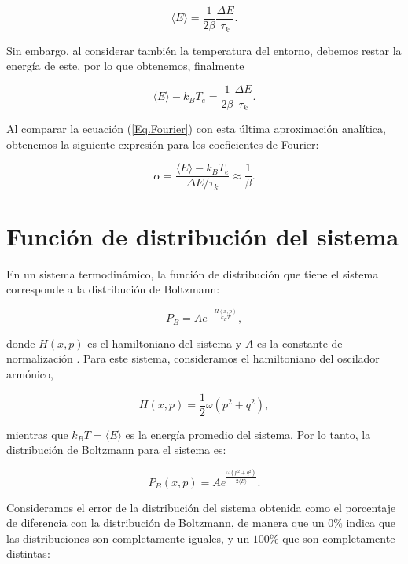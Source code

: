 \documentclass[letterpaper,12pt,oneside]{book}
\begin{document}
	\begin{equation}
	\langle E  \rangle = \frac{1}{2\beta} \frac{\Delta E}{\tau_k}.
	\end{equation}
	
	Sin embargo, al considerar también la temperatura del entorno, debemos restar la energía de este, por lo que obtenemos, finalmente
	
	\begin{equation}
	\langle E  \rangle - k_BT_e = \frac{1}{2\beta} \frac{\Delta E}{\tau_k}.
	\end{equation}
	
	Al comparar la ecuación (\ref{Eq.Fourier}) con esta última aproximación analítica, obtenemos la siguiente expresión para los coeficientes de Fourier:
	
	\begin{equation}\label{eq:FourierNumericalCoeffs}
	\alpha = \frac{\langle E \rangle - k_B T_e}{\Delta E/\tau_k} \approx \frac{1}{\beta}.
	\end{equation}
	
	\section{Funci\'on de distribuci\'on del sistema}
	
	En un sistema termodinámico, la función de distribución que tiene el sistema corresponde a la distribución de Boltzmann:
	
	
	\begin{equation}\label{Eq:BoltzmannDist}
	P_B = Ae^{-\frac{H(x,p)}{k_BT}},
	\end{equation}
	
	\noindent donde $H(x,p)$ es el hamiltoniano del sistema y $A$ es la constante de normalización \cite{CursoFisEstadistica}. Para este sistema, consideramos el hamiltoniano del oscilador arm\'onico, 
	
	\begin{equation}
	H(x,p) = \frac{1}{2}\omega(p^2 + q^2),
	\end{equation}
	
	\noindent mientras que $k_BT = \langle E \rangle$ es la energía promedio del sistema. Por lo tanto, la distribución de Boltzmann para el sistema es:
	
	\begin{equation}
	P_B(x,p) = Ae^{\frac{\omega(p^2+q^2)}{2\langle E \rangle }}.
	\end{equation}
	
	Consideramos el error de la distribución del sistema obtenida como el porcentaje de diferencia con la distribución de Boltzmann, de manera que un $0\%$ indica que las distribuciones son completamente iguales, y un $100\%$ que son completamente distintas:
	
\end{document}
